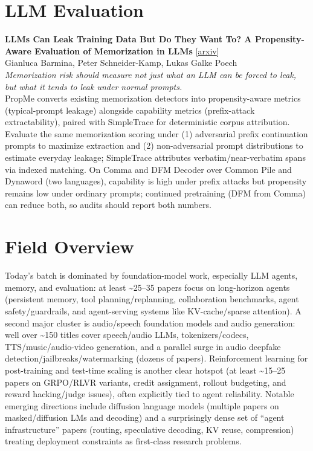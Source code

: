 \documentclass[12pt,letterpaper]{article}
\begin{document}
\medskip


\section*{LLM Evaluation}

{\small\textbf{LLMs Can Leak Training Data But Do They Want To? A Propensity-Aware Evaluation of Memorization in LLMs}} {\scriptsize[\href{https://arxiv.org/abs/2606.06286}{arxiv}]}\\
{\scriptsize Gianluca Barmina, Peter Schneider-Kamp, Lukas Galke Poech}\\

{\small\textit{Memorization risk should measure not just what an LLM can be forced to leak, but what it tends to leak under normal prompts.}}\\[1pt]
{\footnotesize PropMe converts existing memorization detectors into propensity-aware metrics (typical-prompt leakage) alongside capability metrics (prefix-attack extractability), paired with SimpleTrace for deterministic corpus attribution. Evaluate the same memorization scoring under (1) adversarial prefix continuation prompts to maximize extraction and (2) non-adversarial prompt distributions to estimate everyday leakage; SimpleTrace attributes verbatim/near-verbatim spans via indexed matching. On Comma and DFM Decoder over Common Pile and Dynaword (two languages), capability is high under prefix attacks but propensity remains low under ordinary prompts; continued pretraining (DFM from Comma) can reduce both, so audits should report both numbers.}

\medskip



\section*{Field Overview}
{\footnotesize Today's batch is dominated by foundation-model work, especially LLM agents, memory, and evaluation: at least \textasciitilde{}25--35 papers focus on long-horizon agents (persistent memory, tool planning/replanning, collaboration benchmarks, agent safety/guardrails, and agent-serving systems like KV-cache/sparse attention). A second major cluster is audio/speech foundation models and audio generation: well over \textasciitilde{}150 titles cover speech/audio LLMs, tokenizers/codecs, TTS/music/audio-video generation, and a parallel surge in audio deepfake detection/jailbreaks/watermarking (dozens of papers). Reinforcement learning for post-training and test-time scaling is another clear hotspot (at least \textasciitilde{}15--25 papers on GRPO/RLVR variants, credit assignment, rollout budgeting, and reward hacking/judge issues), often explicitly tied to agent reliability. Notable emerging directions include diffusion language models (multiple papers on masked/diffusion LMs and decoding) and a surprisingly dense set of ``agent infrastructure'' papers (routing, speculative decoding, KV reuse, compression) treating deployment constraints as first-class research problems.}
\end{document}
